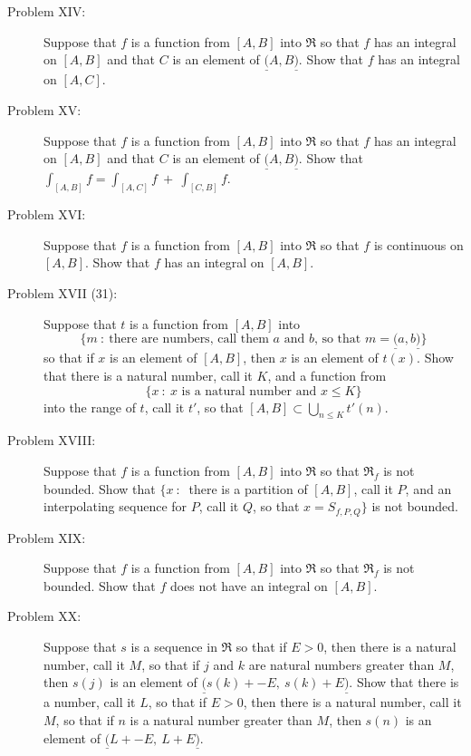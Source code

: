 \documentclass{article}
\begin{document}
\begin{description}
  \item[Problem XIV:] Suppose that $f$ is a function from $[A,B]$ into $\Re$ so that $f$ has an integral on $[A,B]$ and that $C$ is an element of $\underline{(} A,B \underline{)}$. Show that $f$ has an integral on $[A,C]$.

  \item[Problem XV:] Suppose that $f$ is a function from $[A,B]$ into $\Re$ so that $f$ has an integral on $[A,B]$ and that $C$ is an element of $\underline{(} A,B \underline{)}$. Show that $\displaystyle{ \int_{[A,B]} f = \int_{[A,C]} f \ + \ \int_{[C,B]} f}$.

  \item[Problem XVI:] Suppose that $f$ is a function from $[A,B]$ into $\Re$ so that $f$ is continuous on $[A,B]$. Show that $f$ has an integral on $[A,B]$.

  \item[Problem XVII (31):] Suppose that $t$ is a function from $[A,B]$ into 
    \begin{equation*}
    \{ m\ :\ \text{there are numbers, call them $a$ and $b$, so that } m = \underline{(} a,b \underline{)} \}
    \end{equation*}
    so that if $x$ is an element of $[A,B]$, then $x$ is an element of $t(x)$. Show that there is a natural number, call it $K$, and a function from 
    \begin{equation*}
    \{ x\ :\ x \text{ is a natural number and } x \leq K \}
    \end{equation*}
    into the range of $t$, call it $t'$, so that $[A,B] \subset \displaystyle{ \bigcup_{n \leq K} t'(n) }$. 

  \item[Problem XVIII:] Suppose that $f$ is a function from $[A,B]$ into $\Re$ so that $\Re_{f}$ is not bounded. Show that $\{ x\ :\ $ there is a partition of $[A,B]$, call it $P$, and an interpolating sequence for $P$, call it $Q$, so that $x = S_{f,P,Q} \}$ is not bounded.

  \item[Problem XIX:] Suppose that $f$ is a function from $[A,B]$ into $\Re$ so that $\Re_{f}$ is not bounded. Show that $f$ does not have an integral on $[A,B]$.

  \item[Problem XX:] Suppose that $s$ is a sequence in $\Re$ so that if $E > 0$, then there is a natural number, call it $M$, so that if $j$ and $k$ are natural numbers greater than $M$, then $s(j)$ is an element of $\underline{(} s(k) + -E,\ s(k) + E \underline{)}$. Show that there is a number, call it $L$, so that if $E > 0$, then there is a natural number, call it $M$, so that if $n$ is a natural number greater than $M$, then $s(n)$ is an element of $\underline{(} L + -E,\ L + E \underline{)}$.


\end{description}
\end{document}
